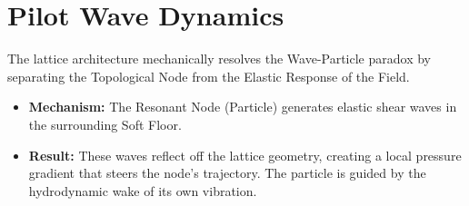 \section{Pilot Wave Dynamics}
The lattice architecture mechanically resolves the Wave-Particle paradox by separating the Topological Node from the Elastic Response of the Field.
\begin{itemize}
    \item \textbf{Mechanism:} The Resonant Node (Particle) generates elastic shear waves in the surrounding Soft Floor.
    \item \textbf{Result:} These waves reflect off the lattice geometry, creating a local pressure gradient that steers the node's trajectory. The particle is guided by the hydrodynamic wake of its own vibration.
\end{itemize}
